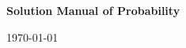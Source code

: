 \documentclass[12pt]{article}
\theoremstyle{plain}
\theoremstyle{definition}
\theoremstyle{remark}
\numberwithin{equation}{section}
\numberwithin{theorem}{section}
\begin{document}
\begin{titlepage}
    \centering

    \vspace*{4cm}

    {\Huge\bfseries
    Solution Manual of Probability
    \par}

    \vfill

    {\large
    \today
    \par}

\end{titlepage}



\newpage

\nocite{*}


\end{document}
